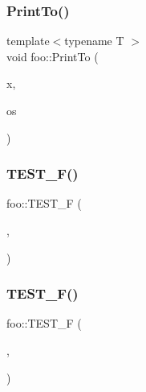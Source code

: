 \mbox{\label{namespacefoo_a7b78eba501ea7ff1226a8cb40b6e3d92}} 
\subsubsection{\texorpdfstring{Print\+To()}{PrintTo()}\hspace{0.1cm}{\footnotesize\ttfamily [2/2]}}
{\footnotesize\ttfamily template$<$typename T $>$ \\
void foo\+::\+Print\+To (\begin{DoxyParamCaption}\item[{const \hyperlink{classfoo_1_1_printable_via_print_to_template}{Printable\+Via\+Print\+To\+Template}$<$ T $>$ \&}]{x,  }\item[{\+::std\+::ostream $\ast$}]{os }\end{DoxyParamCaption})}

\mbox{\label{namespacefoo_a0d50eecc97df56ae625078848ba9c98a}} 
\subsubsection{\texorpdfstring{T\+E\+S\+T\+\_\+\+F()}{TEST\_F()}\hspace{0.1cm}{\footnotesize\ttfamily [1/3]}}
{\footnotesize\ttfamily foo\+::\+T\+E\+S\+T\+\_\+F (\begin{DoxyParamCaption}\item[{\hyperlink{classfoo_1_1_mixed_up_test_case_test}{Mixed\+Up\+Test\+Case\+Test}}]{,  }\item[{First\+Test\+From\+Namespace\+Foo}]{ }\end{DoxyParamCaption})}

\mbox{\label{namespacefoo_a7911fd62b6ae405016caed779b2f95dc}} 
\subsubsection{\texorpdfstring{T\+E\+S\+T\+\_\+\+F()}{TEST\_F()}\hspace{0.1cm}{\footnotesize\ttfamily [2/3]}}
{\footnotesize\ttfamily foo\+::\+T\+E\+S\+T\+\_\+F (\begin{DoxyParamCaption}\item[{\hyperlink{classfoo_1_1_mixed_up_test_case_test}{Mixed\+Up\+Test\+Case\+Test}}]{,  }\item[{Second\+Test\+From\+Namespace\+Foo}]{ }\end{DoxyParamCaption})}

